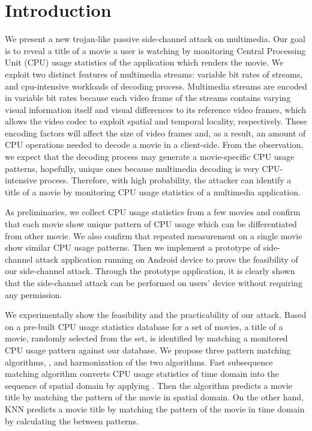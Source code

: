\section{Introduction}
\label{sec:introduction}
We present a new trojan-like passive side-channel attack on multimedia. Our goal is to reveal a title of a movie a user is watching by monitoring Central Processing Unit (CPU) usage statistics of the application which renders the movie. We exploit two distinct features of multimedia streams: variable bit rates of streams, and cpu-intensive workloads of decoding process. Multimedia streams are encoded in variable bit rates because each video frame of the streams contains varying visual information itself and visual differences to its reference video frames, which allows the video codec to exploit spatial and temporal locality, respectively. These encoding factors will affect the size of video frames and, as a result, an amount of CPU operations needed to decode a movie in a client-side. From the observation, we expect that the decoding process may generate a movie-specific CPU usage patterns, hopefully, unique ones because multimedia decoding is very CPU-intensive process. Therefore, with high probability, the attacker can identify a title of a movie by monitoring CPU usage statistics of a multimedia application.  

As preliminaries, we collect CPU usage statistics from a few movies and confirm that each movie show unique pattern of CPU usage which can be differentiated from other movie.  We also confirm that repeated measurement on a single movie show similar CPU usage patterns.  Then we implement a prototype of side-channel attack application running on Android device to prove the feasibility of our side-channel attack.  Through the prototype application, it is clearly shown that the side-channel attack can be performed on users' device without requiring any permission.

We experimentally show the feasibility and the practicability of our attack. Based on a pre-built CPU usage statistics database for a set of movies, a title of a movie, randomly selected from the set, is identified by matching a monitored CPU usage pattern against our database. We propose three pattern matching algorithms, ,  and harmonization of the two algorithms.  Fast subsequence matching algorithm converts CPU usage statistics of time domain into the sequence of spatial domain by applying .   Then the algorithm predicts a movie title by matching the pattern of the movie in spatial domain.  On the other hand, KNN predicts a movie title by matching the pattern of the movie in time domain by calculating the  between patterns. 

